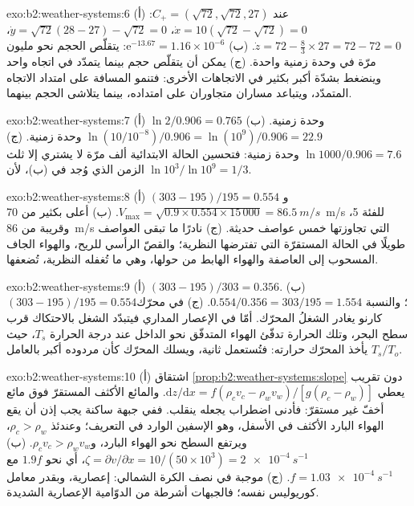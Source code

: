 \begin{solution}{exo:b2:weather-systems:6}
(أ) عند $C_+ = (\sqrt{72}, \sqrt{72}, 27)$: $\dot x = 10(\sqrt{72} - \sqrt{72}) = 0$، $\dot y =
\sqrt{72}(28 - 27) - \sqrt{72} = 0$، $\dot z = 72 - \tfrac83 \times 27 = 72 - 72 = 0$.
(ب) $\mathrm{e}^{-13.67} = 1.16 \times 10^{-6}$: يتقلّص الحجم نحو مليون مرّة في وحدة
زمنية واحدة. (ج) يمكن أن يتقلّص حجم بينما يتمدّد في اتجاه واحد وينضغط بشدّة أكبر بكثير
في الاتجاهات الأخرى: فتنمو المسافة على امتداد الاتجاه المتمدّد، ويتباعد مساران متجاوران
على امتداده، بينما يتلاشى الحجم بينهما.
\end{solution}

\begin{solution}{exo:b2:weather-systems:7}
(أ) $\ln 2/0.906 = 0.765$ وحدة زمنية. (ب) $\ln(10/10^{-8})/0.906 = \ln(10^9)/0.906 = 22.9$ وحدة
زمنية. (ج) $\ln 1000/0.906 = 7.6$ وحدة زمنية: فتحسين الحالة الابتدائية ألف مرّة
لا يشتري إلا ثلث الزمن الذي وُجد في (ب)، لأن $\ln 10^3/\ln 10^9 = 1/3$.
\end{solution}

\begin{solution}{exo:b2:weather-systems:8}
(أ) $(303 - 195)/195 = 0.554$ و$V_{\max} = \sqrt{0.9 \times 0.554 \times 15\,000} =
\qty{86.5}{m/s}$. (ب) أعلى بكثير من \qty{70}{m/s} للفئة 5، وقريبة من \qty{86}{m/s} التي
تجاوزتها خمس عواصف حديثة. (ج) نادرًا ما تبقى العواصف طويلًا في الحالة المستقرّة التي تفترضها
النظرية؛ والقصّ الرأسي للريح، والهواء الجاف المسحوب إلى العاصفة والهواء الهابط من حولها، وهي ما
تُغفله النظرية، تُضعفها.
\end{solution}

\begin{solution}{exo:b2:weather-systems:9}
(أ) $(303 - 195)/303 = 0.356$. (ب) $(303 - 195)/195 = 0.554$؛ والنسبة $0.554/0.356 =
303/195 = 1.554$. (ج) في محرّك كارنو يغادر الشغلُ المحرّك. أمّا في الإعصار المداري فيتبدّد
الشغل بالاحتكاك قرب سطح البحر، وتلك الحرارة تدفّئ الهواء المتدفّق نحو الداخل عند
درجة الحرارة $T_s$، حيث يأخذ المحرّك حرارته: فتُستعمل ثانية، ويسلك المحرّك
كأن مردوده أكبر بالعامل $T_s/T_o$.
\end{solution}

\begin{solution}{exo:b2:weather-systems:10}
(أ) اشتقاق \cref{prop:b2:weather-systems:slope} دون تقريب يعطي
$\mathrm{d}z/\mathrm{d}x = f(\rho_c v_c - \rho_w v_w)/[g(\rho_c - \rho_w)]$. والمائع الأكثف
المستقرّ فوق مائع أخفّ غير مستقرّ: فأدنى اضطراب يجعله ينقلب. ففي جبهة
ساكنة يجب إذن أن يقع الهواء البارد الأكثف في الأسفل، وهو الإسفين الوارد في التعريف؛ وعندئذ
$\rho_c > \rho_w$، ويرتفع السطح نحو الهواء البارد، و$\rho_c v_c > \rho_w v_w$.
(ب) $\zeta = \partial v/\partial x = 10/(50 \times 10^3) = \qty{2e-4}{s^{-1}}$، أي نحو $1.9f$ مع
$f = \qty{1.03e-4}{s^{-1}}$. (ج) موجبة في نصف الكرة الشمالي: إعصارية، وبقدر
معامل كوريوليس نفسه؛ فالجبهات أشرطة من الدوّامية الإعصارية الشديدة.
\end{solution}

